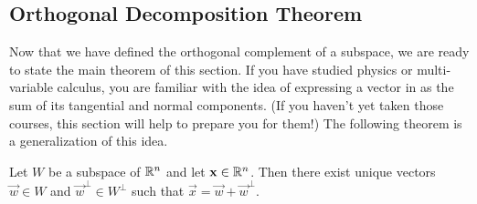 \documentclass{ximera}
\begin{document}
\subsection*{Orthogonal Decomposition Theorem}

Now that we have defined the orthogonal complement of a subspace, we are ready to state the main theorem of this section.  If you have studied physics or multi-variable calculus, you are familiar with the idea of expressing a vector in as the sum of its tangential and normal components. (If you haven't yet taken those courses, this section will help to prepare you for them!)  The following theorem is a generalization of this idea.

\begin{theorem}\label{th:OrthoDecomp}
Let $W$ be a subspace of $\mathbb{R}^n$ and let $\mathbf{x} \in \mathbb{R}^n$.  Then there exist unique vectors $\vec{w} \in W$ and $\vec{w}^\perp \in W^\perp$ such that $\vec{x} = \vec{w} + \vec{w}^\perp$.
\end{theorem}
\end{document}
